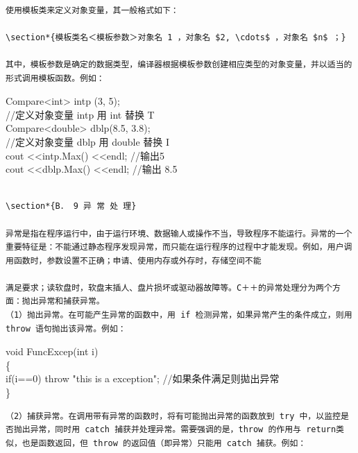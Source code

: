 \documentclass[10pt]{article}
\begin{document}
\begin{verbatim}

使用模板类来定义对象变量，其一般格式如下：

\section*{模板类名＜模板参数＞对象名 1 ，对象名 $2, \cdots$ ，对象名 $n$ ；}

其中，模板参数是确定的数据类型，编译器根据模板参数创建相应类型的对象变量，并以适当的形式调用模板函数。例如：
\end{verbatim}

Compare<int> intp (3, 5);\\
//定义对象变量 intp 用 int 替换 T\\
Compare<double> dblp(8.5, 3.8);\\
//定义对象变量 dblp 用 double 替换 I\\
cout <<intp.Max() <<endl; //输出5\\
cout <<dblp.Max() <<endl; //输出 8.5

\begin{verbatim}

\section*{B． 9 异 常 处 理}

异常是指在程序运行中，由于运行环境、数据输人或操作不当，导致程序不能运行。异常的一个重要特征是：不能通过静态程序发现异常，而只能在运行程序的过程中才能发现。例如，用户调用函数时，参数设置不正确；申请、使用内存或外存时，存储空间不能

满足要求；读软盘时，软盘末插人、盘片损坏或驱动器故障等。C＋＋的异常处理分为两个方面：抛出异常和捕获异常。
（1）抛出异常。在可能产生异常的函数中，用 if 检测异常，如果异常产生的条件成立，则用 throw 语句抛出该异常。例如：
\end{verbatim}

void FuncExcep(int i)\\
\{\\
if(i==0) throw "this is a exception"; //如果条件满足则拋出异常\\
\}

\begin{verbatim}
（2）捕获异常。在调用带有异常的函数时，将有可能抛出异常的函数放到 try 中，以监控是否抛出异常，同时用 catch 捕获并处理异常。需要强调的是，throw 的作用与 return类似，也是函数返回，但 throw 的返回值（即异常）只能用 catch 捕获。例如：
\end{verbatim}
\end{document}
